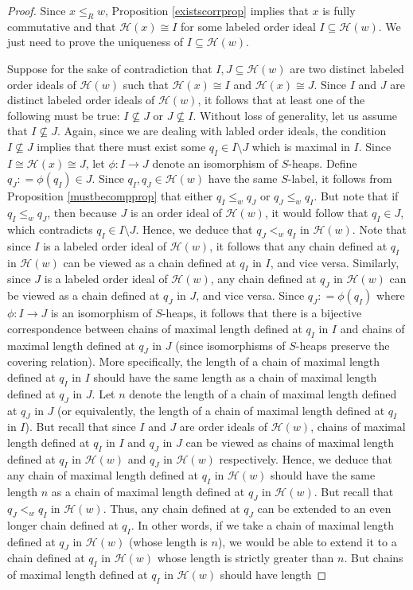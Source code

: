\documentclass{amsart}
\theoremstyle{plain} %
\theoremstyle{definition}
\def\weakr{\leq_{R}}
\def\H#1{\mathcal{H}(#1)}
\begin{document}
\begin{proof}
    Since $ x \weakr w$, Proposition \ref{existscorrprop} implies that $x$ is fully commutative and that $ \H{x} \cong I$ for some labeled order ideal $I \subseteq \H{w}$. We just need to prove the uniqueness of $I \subseteq \H{w}$.

    Suppose for the sake of contradiction that $I, J \subseteq \H{w}$ are two distinct labeled order ideals of $ \H{w}$ such that $ \H{x} \cong I$ and $ \H{x} \cong J$. Since $I$ and $J$ are distinct labeled order ideals of $ \H{w}$, it follows that at least one of the following must be true: $ I \nsubseteq J$ or $ J \nsubseteq I$. Without loss of generality, let us assume that $ I \nsubseteq J$. Again, since we are dealing with labled order ideals, the condition $ I \nsubseteq J$ implies that there must exist some $ q_{I}\in I \setminus J$ which is maximal in $I$. Since $I \cong \H{x} \cong J$, let $ \phi: I \rightarrow J$ denote an isomorphism of $S$-heaps. Define $ q_{J} : = \phi(q_{I}) \in J$. Since $ q_{I}, q_{J} \in \H{w}$ have the same $S$-label, it follows from Proposition \ref{mustbecompprop} that either $ q_{I} \leq_{w} q_{J}$ or $ q_{J} \leq_{w} q_{I}$. But note that if $ q_{I} \leq_{w} q_{J}$, then because $ J$ is an order ideal of $ \H{w}$, it would follow that $ q_{I} \in J$, which contradicts $ q_{I} \in I \setminus J$. Hence, we deduce that $ q_{J} <_{w} q_{I}$ in $\H{w}$. Note that since $ I$ is a labeled order ideal of $ \H{w}$, it follows that any chain defined at $ q_{I}$ in $ \H{w}$ can be viewed as a chain defined at $ q_{I}$ in $I$, and vice versa. Similarly, since $J$ is a labeled order ideal of $ \H{w}$, any chain defined at $ q_{J}$ in $\H{w}$ can be viewed as a chain defined at $ q_{J}$ in $J$, and vice versa. Since $ q_{J} : = \phi(q_{I})$ where $ \phi: I \rightarrow J$ is an isomorphism of $ S$-heaps, it follows that there is a bijective correspondence between chains of maximal length defined at $ q_{I}$ in $I$ and chains of maximal length defined at $ q_{J}$ in $J$ (since isomorphisms of $S$-heaps preserve the covering relation). More specifically, the length of a chain of maximal length defined at $ q_{I}$ in $I$ should have the same length as a chain of maximal length defined at $ q_{J}$ in $J$. Let $n$ denote the length of a chain of maximal length defined at $ q_{J}$ in $J$ (or equivalently, the length of a chain of maximal length defined at $q_{I}$ in $I$). But recall that since $ I$ and $J$ are order ideals of $ \H{w}$, chains of maximal length defined at $q_{I}$ in $ I$ and $ q_{J}$ in $J$ can be viewed as chains of maximal length defined at $ q_{I}$ in $\H{w}$ and $ q_{J}$ in $ \H{w}$ respectively. Hence, we deduce that any chain of maximal length defined at $ q_{I}$ in $ \H{w}$ should have the same length $ n$ as a chain of maximal length defined at $ q_{J}$ in $\H{w}$. But recall that $ q_{J} <_{w} q_{I}$ in $ \H{w}$. Thus, any chain defined at $ q_{J}$ can be extended to an even longer chain defined at $ q_{I}$. In other words, if we take a chain of maximal length defined at $ q_{J}$ in $\H{w}$ (whose length is $n$), we would be able to extend it to a chain defined at $ q_{I}$ in $ \H{w}$ whose length is strictly greater than $n$. But chains of maximal length defined at $ q_{I}$ in $\H{w}$ should have length 
\end{proof}
\end{document}
